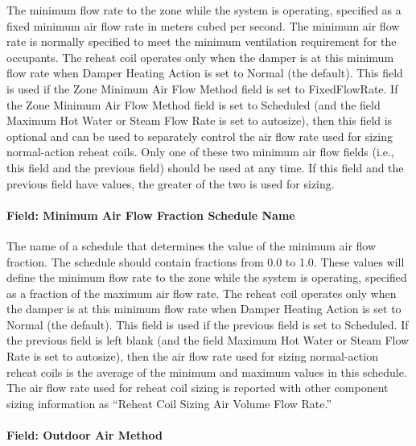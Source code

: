 The minimum flow rate to the zone while the system is operating, specified as a fixed minimum air flow rate in meters cubed per second. The minimum air flow rate is normally specified to meet the minimum ventilation requirement for the occupants. The reheat coil operates only when the damper is at this minimum flow rate when Damper Heating Action is set to Normal (the default). This field is used if the Zone Minimum Air Flow Method field is set to FixedFlowRate. If the Zone Minimum Air Flow Method field is set to Scheduled (and the field Maximum Hot Water or Steam Flow Rate is set to autosize), then this field is optional and can be used to separately control the air flow rate used for sizing normal-action reheat coils. Only one of these two minimum air flow fields (i.e., this field and the previous field) should be used at any time. If this field and the previous field have values, the greater of the two is used for sizing.

\paragraph{Field: Minimum Air Flow Fraction Schedule Name}\label{field-minimum-air-flow-fraction-schedule-name-000}

The name of a schedule that determines the value of the minimum air flow fraction. The schedule should contain fractions from 0.0 to 1.0. These values will define the minimum flow rate to the zone while the system is operating, specified as a fraction of the maximum air flow rate. The reheat coil operates only when the damper is at this minimum flow rate when Damper Heating Action is set to Normal (the default). This field is used if the previous field is set to Scheduled. If the previous field is left blank (and the field Maximum Hot Water or Steam Flow Rate is set to autosize), then the air flow rate used for sizing normal-action reheat coils is the average of the minimum and maximum values in this schedule. The air flow rate used for reheat coil sizing is reported with other component sizing information as ``Reheat Coil Sizing Air Volume Flow Rate.''

\paragraph{Field: Outdoor Air Method}\label{field-outdoor-air-method-8}

